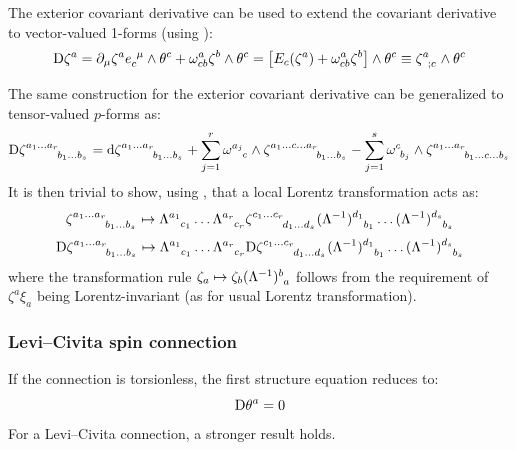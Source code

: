 The exterior covariant derivative can be used to extend the covariant derivative to vector-valued 1-forms (using ):
\begin{equation}
  \dcov \zeta^a = \pa_\mu \zeta^a \tensor{e}{_c^\mu} \wedge \theta^c + \omega^a_{cb} \zeta^b \wedge \theta^c = \left[ E_c(\zeta^a) + \omega^a_{cb} \zeta^b \right] \wedge \theta^c \equiv \tensor{\zeta}{^a_{;c}} \wedge \theta^c
\end{equation}

The same construction for the exterior covariant derivative can be generalized to tensor-valued $ p $-forms as:
\begin{equation}
  \dcov \tensor{\zeta}{^{a_1 \dots a_r}_{b_1 \dots b_s}} = \dd \tensor{\zeta}{^{a_1 \dots a_r}_{b_1 \dots b_s}} + \sum_{j = 1}^r \tensor{\omega}{^{a_j}_c} \wedge \tensor{\zeta}{^{a_1 \dots c \dots a_r}_{b_1 \dots b_s}} - \sum_{j = 1}^s \tensor{\omega}{^c_{b_j}} \wedge \tensor{\zeta}{^{a_1 \dots a_r}_{b_1 \dots c \dots b_s}}
  \label{eq:dcov}
\end{equation}
It is then trivial to show, using , that a local Lorentz transformation acts as:
\begin{equation}
  \tensor{\zeta}{^{a_1 \dots a_r}_{b_1 \dots b_s}} \mapsto \tensor{\Lambda}{^{a_1}_{c_1}} \dots \tensor{\Lambda}{^{a_r}_{c_r}} \tensor{\zeta}{^{c_1 \dots c_r}_{d_1 \dots d_s}} \tensor{(\Lambda^{-1})}{^{d_1}_{b_1}} \dots \tensor{(\Lambda^{-1})}{^{d_s}_{b_s}}
\end{equation}
\begin{equation}
  \dcov\tensor{\zeta}{^{a_1 \dots a_r}_{b_1 \dots b_s}} \mapsto \tensor{\Lambda}{^{a_1}_{c_1}} \dots \tensor{\Lambda}{^{a_r}_{c_r}} \dcov\tensor{\zeta}{^{c_1 \dots c_r}_{d_1 \dots d_s}} \tensor{(\Lambda^{-1})}{^{d_1}_{b_1}} \dots \tensor{(\Lambda^{-1})}{^{d_s}_{b_s}}
\end{equation}
where the transformation rule $ \zeta_a \mapsto \zeta_b \tensor{(\Lambda^{-1})}{^b_a} $ follows from the requirement of $ \zeta^a \xi_a $ being Lorentz-invariant (as for usual Lorentz transformation).

\subsubsection{Levi--Civita spin connection}

If the connection is torsionless, the first structure equation reduces to:
\begin{equation}
  \mathrm{D} \theta^a = 0
  \label{eq:first-cartan-stru-eq}
\end{equation}
For a Levi--Civita connection, a stronger result holds.

